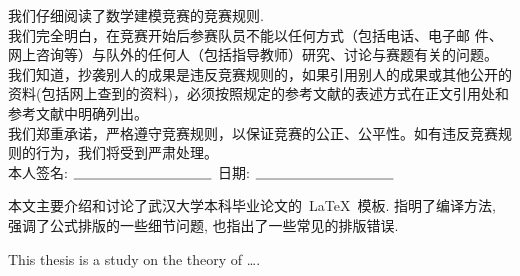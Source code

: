 {%

我们仔细阅读了数学建模竞赛的竞赛规则.\\
我们完全明白，在竞赛开始后参赛队员不能以任何方式（包括电话、电子邮 件、网上咨询等）与队外的任何人（包括指导教师）研究、讨论与赛题有关的问题。\\
我们知道，抄袭别人的成果是违反竞赛规则的，如果引用别人的成果或其他公开的资料(包括网上查到的资料)，必须按照规定的参考文献的表述方式在正文引用处和参考文献中明确列出。\\
我们郑重承诺，严格遵守竞赛规则，以保证竞赛的公正、公平性。如有违反竞赛规则的行为，我们将受到严肃处理。
\\[2cm]

\hspace*{1cm}本人签名: $\underline{\hspace{3.5cm}}$
\hspace{2cm}日期: $\underline{\hspace{3.5cm}}$\hfill\par}
\baselineskip=23pt  %





\begin{cnabstract}
本文主要介绍和讨论了武汉大学本科毕业论文的~\LaTeX~模板.
指明了编译方法, 强调了公式排版的一些细节问题, 也指出了一些常见的排版错误.



\end{cnabstract}
\par
\vspace*{2em}






\begin{enabstract}
This thesis is a study on the theory of \dots.

\end{enabstract}
\par
\vspace*{2em}

 \enkeywords{\LaTeX{};  }
